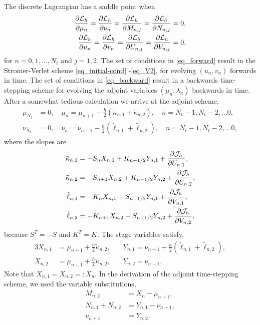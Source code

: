 \documentclass[11pt]{article}
\begin{document}
The discrete Lagrangian has a saddle point when
\begin{align}
  \frac{\partial{\cal L}_h}{\partial \mu_n} =
  \frac{\partial{\cal L}_h}{\partial \nu_n} =
  \frac{\partial{\cal L}_h}{\partial M_{n,j}} =
  \frac{\partial{\cal L}_h}{\partial N_{n,j}} &= 0,\label{eq_forward}\\
  \frac{\partial{\cal L}_h}{\partial u_n} =
  \frac{\partial{\cal L}_h}{\partial v_n} =
  \frac{\partial{\cal L}_h}{\partial U_{n,j}} =
  \frac{\partial{\cal L}_h}{\partial V_{n,j}} &= 0,\label{eq_backward}
\end{align}
for $n=0,1,\ldots,N_t$ and $j=1,2$. The set of conditions in \eqref{eq_forward} result in the
Stromer-Verlet scheme \eqref{eq_initial-cond} -\eqref{eq_V2}, for evolving $(u_n, v_n)$ forwards in
time. The set of conditions in \eqref{eq_backward} result in a backwards time-stepping scheme
for evolving the adjoint variables $(\mu_n, \lambda_n)$ backwards in time. After a
somewhat tedious calculation we arrive at the adjoint scheme,
\begin{align}
  \mu_{N_t} &= 0,\quad \mu_n = \mu_{n+1} - \frac{h}{2} \left(\tilde\kappa_{n,1} +
  \tilde\kappa_{n,2}\right),\quad n=N_t -1, N_t - 2, \ldots 0,\\
  \nu_{N_t} &= 0,\quad \nu_{n} = \nu_{n+1} - \frac{h}{2} \left( \tilde\ell_{n,1} + \tilde\ell_{n,2} \right),\quad n=N_t -1, N_t -2, \ldots 0,
\end{align}
where the slopes are
\begin{align}
\tilde\kappa_{n,1} &= -S_n X_{n,1} + K_{n+1/2} Y_{n,1} + \frac{\partial {\cal J}_h}{\partial U_{n,1}} ,\\
\tilde\kappa_{n,2} &= -S_{n+1} X_{n,2} + K_{n+1/2} Y_{n,2}  + \frac{\partial {\cal J}_h}{\partial U_{n,2}},\\
\tilde\ell_{n,1} &= -K_{n} X_{n,1} - S_{n+1/2} Y_{n,1}  + \frac{\partial {\cal J}_h}{\partial V_{n,1}},\\
\tilde\ell_{n,2} &= -K_{n+1} X_{n,2} - S_{n+1/2} Y_{n,2}  + \frac{\partial {\cal J}_h}{\partial V_{n,2}},
\end{align}
because $S^T = -S$ and $K^T = K$. The stage variables satisfy,
\begin{alignat}{3}
  X_{n,1} &= \mu_{n+1} + \frac{h}{2} \tilde\kappa_{n,2},\quad
  &Y_{n,1} = \nu_{n+1} +\frac{h}{2} \left( \tilde\ell_{n,1} + \tilde\ell_{n,2} \right),\\
  X_{n,2} & = \mu_{n+1} + \frac{h}{2} \tilde\kappa_{n,2},\quad
  &Y_{n,2} = \nu_{n+1}.
\end{alignat}
Note that $X_{n,1}=X_{n,2} =: X_n$. In the derivation of the adjoint time-stepping scheme, we used
the variable substitutions,
\begin{align}
  M_{n,2} &= X_{n} - \mu_{n+1},\\
  N_{n,1} + N_{n,2} &= Y_{n,1} - \nu_{n+1},\\
  \nu_{n+1} &= Y_{n,2}.
\end{align}
\end{document}
